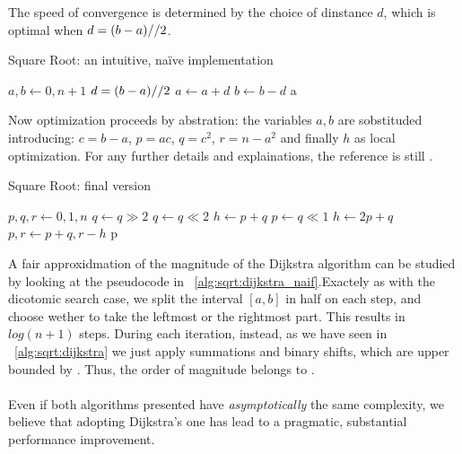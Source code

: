 The speed of convergence is determined by the choice of dinstance $d$, which is optimal when
$d = (b-a) // 2$.

\begin{algorithm}
  \caption{Square Root: an intuitive, na\"ive implementation}
  \label{alg:sqrt:dijkstra_naif}
  \begin{algorithmic}[1]
    \State $a, b \gets 0, n+1$
      \State $d = (b-a) // 2$
         $a \gets a+d$
         $b \gets b-d$
      \EndIf
    \EndWhile
    \State \Return a
  \end{algorithmic}
\end{algorithm}

Now optimization proceeds by abstration: the variables $a, b$ are sobstituded
introducing:
$c = b-a$,
$p = ac$,
$q = c^2$,
$r = n-a^2$
and finally $h$ as local optimization. For any further details and
explainations, the reference is still \cite{Dijkstra:adop}.

\begin{algorithm}
  \caption{Square Root: final version}
  \label{alg:sqrt:dijkstra}
  \begin{algorithmic}
    \State $p, q, r \gets 0, 1, n$
     $q \gets q \gg 2$ \EndWhile
      \State $q \gets q \ll 2$
      \State $h \gets p+q$
      \State $p \gets q \ll 1$
      \State $h \gets 2p + q$
       $p, r \gets p+q, r-h$ \EndIf
    \EndWhile
    \State \Return p
  \end{algorithmic}
\end{algorithm}

A fair approxidmation of the magnitude of the Dijkstra algorithm can be studied
by looking at the pseudocode in ~\ref{alg:sqrt:dijkstra_naif}.Exactely as with
the dicotomic search case, we split the interval $[a, b]$ in half on each step,
and choose wether to take the leftmost or the rightmost part. This results in
$log(n+1)$ steps. During each iteration, instead, as we have seen in
~\ref{alg:sqrt:dijkstra} we just apply summations and binary shifts, which are
upper bounded by . Thus, the order of magnitude belongs to
.

\paragraph{}
Even if both algorithms presented have \emph{asymptotically} the same
complexity, we believe that adopting Dijkstra's one has lead to a pragmatic,
substantial performance improvement.

